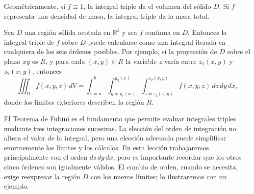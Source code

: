 Geométricamente, si \(f\equiv 1\), la integral triple da el volumen del sólido \(D\). Si \(f\) representa una densidad de masa, la integral triple da la masa total.

\begin{theorem} \label{th:fubini3d}
Sea \(D\) una región sólida acotada en \(\mathbb{R}^3\) y sea \(f\) continua en \(D\). Entonces la integral triple de \(f\) sobre \(D\) puede calcularse como una integral iterada en cualquiera de los seis órdenes posibles. Por ejemplo, si la proyección de \(D\) sobre el plano \(xy\) es \(R\), y para cada \((x,y)\in R\) la variable \(z\) varía entre \(z_1(x,y)\) y \(z_2(x,y)\), entonces
\[
\iiint_D f(x,y,z)\,dV
=
\int_{x=a}^{b}\int_{y=g_1(x)}^{g_2(x)}
\int_{z=z_1(x,y)}^{z_2(x,y)}
f(x,y,z)\,dz\,dy\,dx,
\]
donde los límites exteriores describen la región \(R\).
\end{theorem}

\begin{rem}
El Teorema de Fubini es el fundamento que permite evaluar integrales triples mediante tres integraciones sucesivas. La elección del orden de integración no altera el valor de la integral, pero una elección adecuada puede simplificar enormemente los límites y los cálculos. En esta lección trabajaremos principalmente con el orden \(dz\,dy\,dx\), pero es importante recordar que los otros cinco órdenes son igualmente válidos. El cambio de orden, cuando se necesita, exige reexpresar la región \(D\) con los nuevos límites; lo ilustraremos con un ejemplo.
\end{rem}

